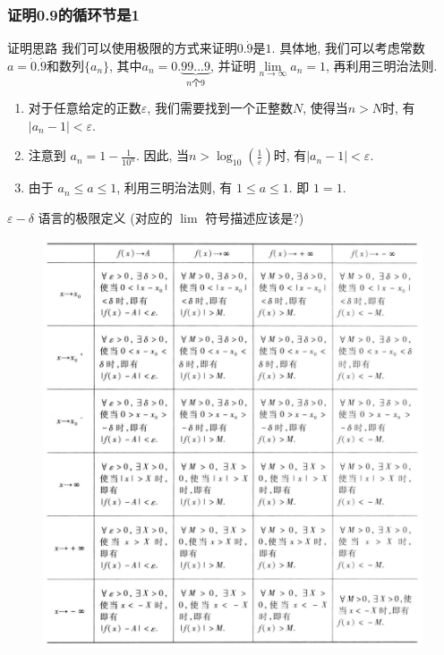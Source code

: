 \documentclass[
10pt,
aspectratio=43,
]{beamer}
\begin{document}
\begin{frame}
	\frametitle{证明0.9的循环节是1}

	\begin{block}{证明思路}
		我们可以使用极限的方式来证明$0.\dot{9}$是$1$. 具体地, 我们可以考虑常数 $a=\dot0.\dot{9}$和数列$\{a_n\}$, 其中$a_n = 0.\underbrace{99\ldots9}_{n \text{个}9}$, 并证明$\lim\limits_{n \to \infty} a_n = 1$, 再利用三明治法则.
	\end{block}
	\pause
	\begin{exampleblock}{}
		\begin{enumerate}
			\item 	  对于任意给定的正数$\varepsilon$, 我们需要找到一个正整数$N$, 使得当$n>N$时, 有$|a_n - 1| < \varepsilon$.
			\item 	  注意到 $a_n = 1-\frac{1}{10^n}$. 因此, 当$n > \log_{10}\left(\frac{1}{\varepsilon}\right)$时, 有$|a_n - 1| < \varepsilon$.
			\item 由于 $a_n\leq a\leq 1$, 利用三明治法则, 有 $1\leq a\leq 1$. 即 $1=1$.
		\end{enumerate}
	\end{exampleblock}
\end{frame}


\begin{frame}{$\varepsilon-\delta$ 语言的极限定义 (对应的 $\lim$ 符号描述应该是?)}
	\begin{figure}
		\centering
		\includegraphics[width=\textwidth,height=0.8\textheight,keepaspectratio]{epsilon-delta.png}
	\end{figure}
\end{frame}
\end{document}
